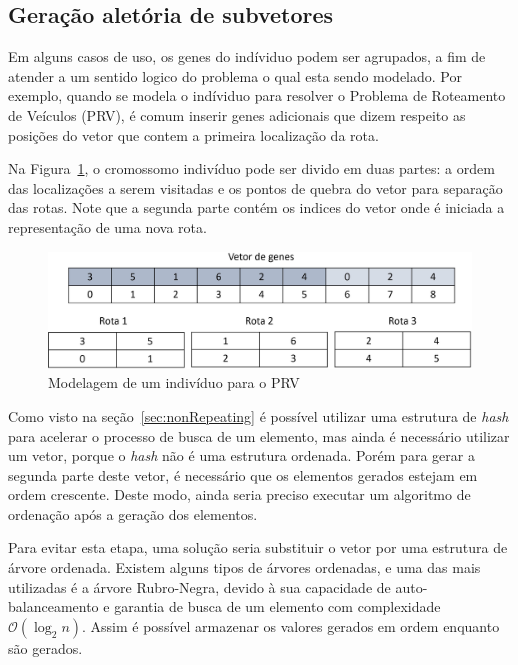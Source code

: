 \documentclass[12pt]{article}
\begin{document}
\subsection{Gera\c{c}\~{a}o alet\'{o}ria de subvetores}

Em alguns casos de uso, os genes do ind\'{i}viduo podem ser agrupados, a fim de atender a um sentido logico do problema
o qual esta sendo modelado. Por exemplo, quando se modela o ind\'{i}viduo para resolver o Problema de Roteamento de
Ve\'{i}culos (PRV), \'{e} comum inserir genes adicionais que dizem respeito as posi\c{c}\~{o}es do vetor que contem a primeira
localiza\c{c}\~{a}o da rota.

Na Figura~\ref{fig:vrpGenes}, o cromossomo indiv\'{i}duo pode ser divido em duas partes: a ordem das localiza\c{c}\~{o}es
a serem visitadas e os pontos de quebra do vetor para separa\c{c}\~{a}o das rotas. Note que a segunda parte cont\'{e}m os
indices do vetor onde \'{e} iniciada a representa\c{c}\~{a}o de uma nova rota.

\begin{figure}[ht]
    \centering
    \includegraphics[width=.8\textwidth]{vrp_genes.jpg}
    \caption{Modelagem de um indiv\'{i}duo para o PRV}
    \label{fig:vrpGenes}
\end{figure}

Como visto na se\c{c}\~{a}o~\ref{sec:nonRepeating} \'{e} poss\'{i}vel utilizar uma estrutura de \textit{hash} para
acelerar o processo de busca de um elemento, mas ainda \'{e} necess\'{a}rio utilizar um vetor, porque o
\textit{hash} n\~{a}o \'{e} uma estrutura ordenada. Por\'{e}m para gerar a segunda parte deste vetor, \'{e} necess\'{a}rio que
os elementos gerados estejam em ordem crescente. Deste modo, ainda seria preciso executar um
algoritmo de ordena\c{c}\~{a}o ap\'{o}s a gera\c{c}\~{a}o dos elementos.

Para evitar esta etapa, uma solu\c{c}\~{a}o seria substituir o vetor por uma estrutura de \'{a}rvore ordenada. Existem
alguns tipos de \'{a}rvores ordenadas, e uma das mais utilizadas \'{e} a \'{a}rvore Rubro-Negra, devido \`{a} sua
capacidade de auto-balanceamento e garantia de busca de um elemento com complexidade $\mathcal{O}(\log_2n)$.
Assim \'{e} poss\'{i}vel armazenar os valores gerados em ordem enquanto s\~{a}o gerados.
\end{document}

